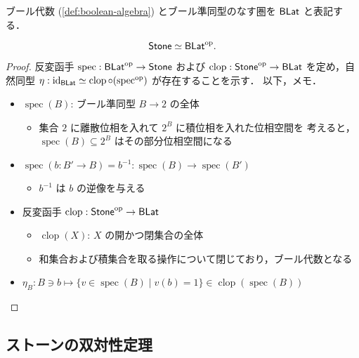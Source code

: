 \documentclass[titlepage]{ltjsreport}
\begin{document}
\begin{definition}[ブール代数の圏]
  ブール代数 (\cref{def:boolean-algebra})
  とブール準同型のなす圏を $\mathsf{BLat}$ と表記する．
\end{definition}

\newcommand{\spec}{\operatorname{spec}}
\newcommand{\clop}{\operatorname{clop}}

\begin{theorem}[ストーンの表現定理]
  \begin{equation}
    \mathsf{Stone}\simeq\mathsf{BLat}^\mathrm{op}.
  \end{equation}
\end{theorem}

\begin{proof}
  反変函手 $\spec:\blat^\mathrm{op}\to\stone$ および
  $\clop:\stone^\mathrm{op}\to\blat$ を定め，自然同型
  $\eta:\id{\blat}\simeq\clop\circ(\spec^\mathrm{op})$ が存在することを示す．
  以下，メモ．
  \begin{itemize}
    \item $\spec(B)$: ブール準同型 $B\to2$ の全体
          \begin{itemize}
            \item 集合 $2$ に離散位相を入れて $2^B$ に積位相を入れた位相空間を
                  考えると，$\spec(B)\subseteq 2^B$ はその部分位相空間になる
          \end{itemize}
    \item $\spec(b:B'\to B)=b^{-1}:\spec(B)\to\spec(B')$
          \begin{itemize}
            \item $b^{-1}$ は $b$ の逆像を与える
          \end{itemize}
    \item 反変函手 $\clop:\stone^\mathrm{op}\to\blat$
          \begin{itemize}
            \item $\clop(X)$: $X$ の開かつ閉集合の全体
            \item 和集合および積集合を取る操作について閉じており，ブール代数となる
          \end{itemize}
    \item $\eta_B:B\ni b\mapsto\{v\in\spec(B)\mid v(b)=1\}\in\clop(\spec(B))$
  \end{itemize}
\end{proof}

\subsection{ストーンの双対性定理}
\end{document}

